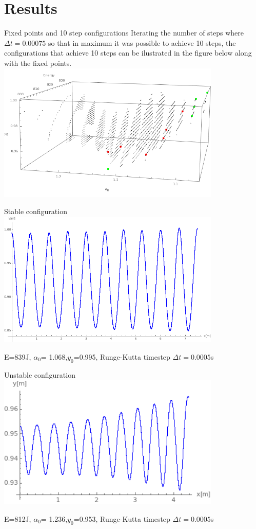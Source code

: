 \documentclass{beamer}
\begin{document}
\section{Results}
\begin{frame}{Fixed points and 10 step configurations}
  Iterating the number of steps where $\Delta t=0.00075$ so that in maximum it was possible to achieve 10 steps, the configurations that achieve 10 steps can be ilustrated in the figure below along with the fixed points.
  \includegraphics[width=0.8\textwidth]{newfixedpoints.png}


\end{frame}

\begin{frame}{Stable configuration}
  \includegraphics[width=0.8\textwidth]{Stable10steps.png}
  
  E=839J, $\alpha_0$= 1.068,$y_0$=0.995, Runge-Kutta timestep $\Delta t=0.0005$s
\end{frame}

\begin{frame}{Unstable configuration}
  \includegraphics[width=0.8\textwidth]{unstableconfiguration.png}
  
   E=812J, $\alpha_0$= 1.236,$y_0$=0.953, Runge-Kutta timestep $\Delta t=0.0005$s
  
\end{frame}
\end{document}
